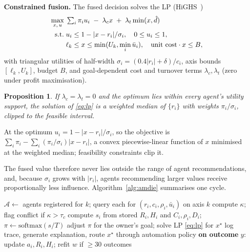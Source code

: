 \documentclass[conference]{IEEEtran}
\newtheorem{proposition}{Proposition}
\newcommand{\amdie}{\textsc{amdie}}
\begin{document}
\textbf{Constrained fusion.} The fused decision solves the LP (HiGHS~\cite{huangfu2018})
\begin{align}
\max_{x,\,u}\;& \textstyle\sum_i \pi_i u_i \;-\; \lambda_c x \;+\; \lambda_t\min(x,\hat d) \label{eq:lp}\\
\text{s.t.}\;& u_i\le 1-|x-r_i|/\sigma_i,\quad 0\le u_i\le1, \notag\\
& \ell_k\le x\le \min(U_k,\min_i\bar u_i),\quad \text{unit cost}\cdot x\le B, \notag
\end{align}
with triangular utilities of half-width $\sigma_i=(0.4|r_i|+\delta)/c_i$, axis bounds $[\ell_k,U_k]$, budget $B$, and goal-dependent cost and turnover terms $\lambda_c,\lambda_t$ (zero under profit maximisation).

\begin{proposition}
If $\lambda_c=\lambda_t=0$ and the optimum lies within every agent's utility support, the solution of \eqref{eq:lp} is a weighted median of $\{r_i\}$ with weights $\pi_i/\sigma_i$, clipped to the feasible interval.
\end{proposition}
\begin{IEEEproof}[Sketch]
At the optimum $u_i=1-|x-r_i|/\sigma_i$, so the objective is $\sum_i\pi_i-\sum_i(\pi_i/\sigma_i)|x-r_i|$, a convex piecewise-linear function of $x$ minimised at the weighted median; feasibility constraints clip it.
\end{IEEEproof}
The fused value therefore never lies outside the range of agent recommendations, and, because $\sigma_i$ grows with $|r_i|$, agents recommending larger values receive proportionally less influence. Algorithm~\ref{alg:amdie} summarises one cycle.

\begin{algorithm}[t]
\caption{One \amdie{} cycle for decision type $k$}
\label{alg:amdie}
\footnotesize
\begin{algorithmic}[1]
\State $\mathcal{A}\gets$ agents registered for $k$; query each for $(r_i,c_i,\rho_i,\bar u_i)$ on axis $k$
\State compute $\kappa$; flag conflict if $\kappa>\tau_c$
\State compute $s_i$ from stored $R_i,H_i$ and $C_i,\rho_i,D_i$; $\pi\gets\mathrm{softmax}(s/T)$
\State adjust $\pi$ for the owner's goal; solve LP \eqref{eq:lp} for $x^\star$
\State log trace, generate explanation, route $x^\star$ through automation policy
\State \textbf{on outcome} $y$: update $a_i, R_i, H_i$; refit $w$ if $\geq 30$ outcomes
\end{algorithmic}
\end{algorithm}
\end{document}
